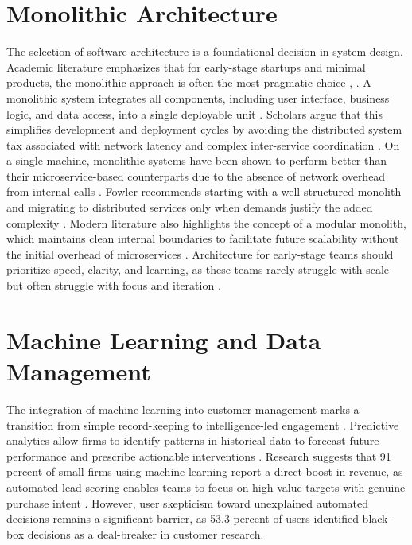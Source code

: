 \section{Monolithic Architecture}
The selection of software architecture is a foundational decision in system design. Academic literature emphasizes that for early-stage startups and minimal products, the monolithic approach is often the most pragmatic choice \cite{thalor2024monolithic}, \cite{villamizar2022performance}. A monolithic system integrates all components, including user interface, business logic, and data access, into a single deployable unit \cite{thalor2024monolithic}. Scholars argue that this simplifies development and deployment cycles by avoiding the distributed system tax associated with network latency and complex inter-service coordination \cite{fowler2020monolith}.
On a single machine, monolithic systems have been shown to perform better than their microservice-based counterparts due to the absence of network overhead from internal calls \cite{villamizar2022performance}. Fowler recommends starting with a well-structured monolith and migrating to distributed services only when demands justify the added complexity \cite{fowler2020monolith}. Modern literature also highlights the concept of a modular monolith, which maintains clean internal boundaries to facilitate future scalability without the initial overhead of microservices \cite{thalor2024monolithic}. Architecture for early-stage teams should prioritize speed, clarity, and learning, as these teams rarely struggle with scale but often struggle with focus and iteration \cite{fluxx2024monolith}.

\section{Machine Learning and Data Management}
The integration of machine learning into customer management marks a transition from simple record-keeping to intelligence-led engagement \cite{saha2025crm}. Predictive analytics allow firms to identify patterns in historical data to forecast future performance and prescribe actionable interventions \cite{agbaakin2025leveraging}. Research suggests that 91 percent of small firms using machine learning report a direct boost in revenue, as automated lead scoring enables teams to focus on high-value targets with genuine purchase intent \cite{agbaakin2025leveraging}. However, user skepticism toward unexplained automated decisions remains a significant barrier, as 53.3 percent of users identified black-box decisions as a deal-breaker in customer research.

